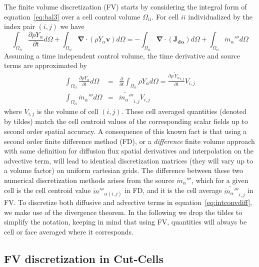 The finite volume discretization (FV) starts by considering the integral form of equation~\eqref{eq:bal3} over a cell control volume $\Omega_{ii}$. For
cell $ii$ individualized by the index pair $(i,j)$ we have
%
\begin{equation}
 \int_{\Omega_{ii}} {\frac{\partial \rho Y_\alpha}{\partial t}} d \Omega + \int_{\Omega_{ii}} { \boldsymbol{\nabla} \cdot  \left(  \rho Y_\alpha \mathbf{v} \right)
      } d \Omega  = -\int_{\Omega_{ii}} { \boldsymbol{\nabla} \cdot \left(  \mathbf{J_{d \alpha}}  \right)  } d \Omega + \int_{\Omega_{ii}} { \dot{m}_\alpha''' } d \Omega \label{eq:intconvdiff}
\end{equation}
%
Assuming a time independent control volume, the time derivative and source terms are approximated by
%
\begin{eqnarray}
  \int_{\Omega_{ii}} {\frac{\partial \rho Y_\alpha}{\partial t}} d \Omega & = & \frac{\partial}{\partial t} \int_{\Omega_{ii}} {\rho Y_\alpha} d \Omega
  = \frac{\partial \widetilde{\rho \: Y_\alpha }_{i,j}}{\partial t} V_{i,j} \\
  \int_{\Omega_{ii}} { \dot{m}_\alpha''' } d \Omega & = & \widetilde{ \dot{m}_\alpha''' }_{i,j} V_{i,j} \label{eq:intcons}
\end{eqnarray}
%
where $V_{i,j}$ is the volume of cell $(i,j)$. These cell averaged quantities (denoted by tildes) match the cell centroid values of the corresponding scalar fields up to second order spatial accuracy. A consequence of this known fact is that using a second order finite difference method (FD), or a \textit{difference} finite volume approach with same definition
 for diffusion flux spatial derivatives and interpolation on the advective term, will lead to identical discretization matrices (they will vary up to a volume factor) on uniform cartesian grids. The difference between these two numerical discretization methods arises from the source $\dot{m}_\alpha''' $, which for a given cell is the cell centroid value $\dot{m}'''_{\alpha (i,j)}$ in FD, and it is the cell average $ \widetilde{ \dot{m}_\alpha''' }_{i,j}$ in FV. To discretize both diffusive and advective terms in equation~\eqref{eq:intconvdiff}, we make use of the divergence theorem. In the following we drop the tildes to simplify the notation, keeping in mind that using FV, quantities will always be cell or face averaged where it corresponds.


\subsection{FV discretization in Cut-Cells} \label{sec:cc}

